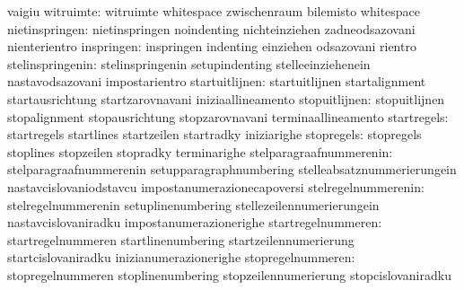                                   vaigiu                           %
                       witruimte: witruimte                        whitespace
                                  zwischenraum                     bilemisto
                                  whitespace                       %
                  nietinspringen: nietinspringen                   noindenting
                                  nichteinziehen                   zadneodsazovani
                                  nienterientro
                      inspringen: inspringen                       indenting
                                  einziehen                        odsazovani
                                  rientro
                stelinspringenin: stelinspringenin                 setupindenting
                                  stelleeinziehenein               nastavodsazovani
                                  impostarientro
                  startuitlijnen: startuitlijnen                   startalignment
                                  startausrichtung                 startzarovnavani
                                  iniziaallineamento
                   stopuitlijnen: stopuitlijnen                    stopalignment
                                  stopausrichtung                  stopzarovnavani
                                  terminaallineamento
                     startregels: startregels                      startlines
                                  startzeilen                      startradky
                                  iniziarighe
                      stopregels: stopregels                       stoplines
                                  stopzeilen                       stopradky
                                  terminarighe
         stelparagraafnummerenin: stelparagraafnummerenin          setupparagraphnumbering
                                  stelleabsatznummerierungein      nastavcislovaniodstavcu
                                  impostanumerazionecapoversi
             stelregelnummerenin: stelregelnummerenin              setuplinenumbering
                                  stellezeilennumerierungein       nastavcislovaniradku
                                  impostanumerazionerighe
              startregelnummeren: startregelnummeren               startlinenumbering
                                  startzeilennumerierung           startcislovaniradku
                                  inizianumerazionerighe
               stopregelnummeren: stopregelnummeren                stoplinenumbering
                                  stopzeilennumerierung            stopcislovaniradku

